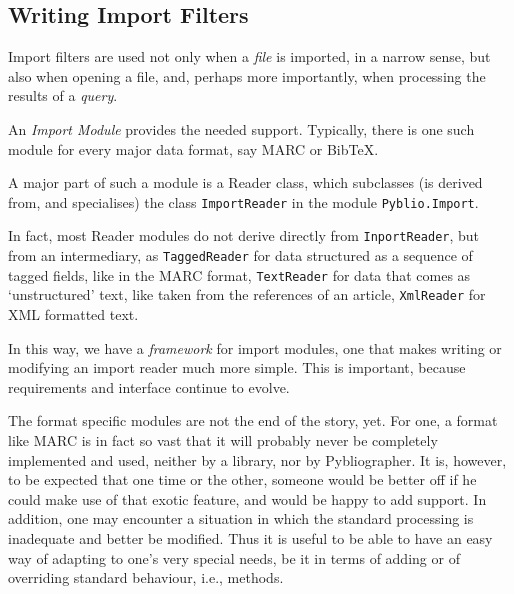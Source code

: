   

   



\subsection{Writing Import Filters}
\label{sec:importfilter}

Import filters are used not only when a \textit{file} is imported, in
a narrow sense, but also when opening a file, and, perhaps more
importantly, when processing the results of a \textit{query}.

An \textit{Import Module} provides the needed support. Typically, there
is one such module for every major data format, say MARC or Bib\TeX.

A major part of such a module is a Reader class, which subclasses (is
derived from, and specialises) the class \texttt{ImportReader} in the
module \texttt{Pyblio.Import}. 

In fact, most Reader modules do not derive directly from
\texttt{InportReader}, but from an intermediary, as
\texttt{TaggedReader} for data structured as a sequence of tagged
fields, like in the MARC format, \texttt{TextReader} for data that
comes as `unstructured' text, like taken from the references of an
article, \texttt{XmlReader} for XML formatted text.

In this way, we have a \textit{framework} for import modules, one that
makes writing or modifying an import reader much more simple. This is
important, because requirements and interface continue to evolve. 

The format specific modules are not the end of the story, yet. For
one, a format like MARC is in fact so vast that it will probably never
be completely implemented and used, neither by a library, nor by
Pybliographer. It is, however, to be expected that one time or the
other, someone would be better off if he could make use of that exotic
feature, and would be happy to add support. In addition, one may
encounter a situation in which the standard processing is inadequate
and better be modified.  Thus it is useful to be able to have an easy
way of adapting to one's very special needs, be it in terms of adding
or of overriding standard behaviour, i.e., methods.

